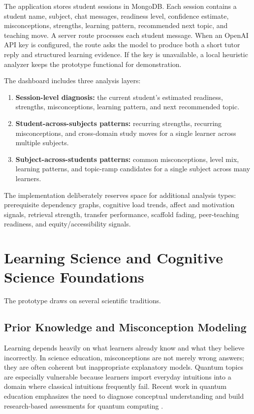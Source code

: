 \documentclass[11pt]{article}
\begin{document}
The application stores student sessions in MongoDB. Each session contains a student name, subject, chat messages, readiness level, confidence estimate, misconceptions, strengths, learning pattern, recommended next topic, and teaching move. A server route processes each student message. When an OpenAI API key is configured, the route asks the model to produce both a short tutor reply and structured learning evidence. If the key is unavailable, a local heuristic analyzer keeps the prototype functional for demonstration.

The dashboard includes three analysis layers:

\begin{enumerate}[leftmargin=*]
  \item \textbf{Session-level diagnosis:} the current student's estimated readiness, strengths, misconceptions, learning pattern, and next recommended topic.
  \item \textbf{Student-across-subjects patterns:} recurring strengths, recurring misconceptions, and cross-domain study moves for a single learner across multiple subjects.
  \item \textbf{Subject-across-students patterns:} common misconceptions, level mix, learning patterns, and topic-ramp candidates for a single subject across many learners.
\end{enumerate}

The implementation deliberately reserves space for additional analysis types: prerequisite dependency graphs, cognitive load trends, affect and motivation signals, retrieval strength, transfer performance, scaffold fading, peer-teaching readiness, and equity/accessibility signals.

\section{Learning Science and Cognitive Science Foundations}

The prototype draws on several scientific traditions.

\subsection{Prior Knowledge and Misconception Modeling}

Learning depends heavily on what learners already know and what they believe incorrectly. In science education, misconceptions are not merely wrong answers; they are often coherent but inappropriate explanatory models. Quantum topics are especially vulnerable because learners import everyday intuitions into a domain where classical intuitions frequently fail. Recent work in quantum education emphasizes the need to diagnose conceptual understanding and build research-based assessments for quantum computing \cite{meyer2026qccs, mcginness2025inventory, hu2024quantum}.
\end{document}
